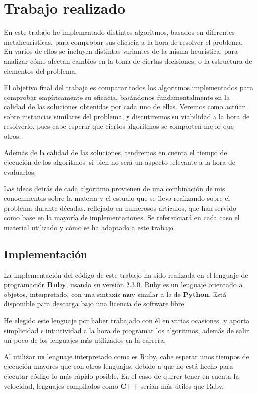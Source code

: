 \section{Trabajo realizado}

En este trabajo he implementado distintos algoritmos, basados en diferentes
metaheurísticas, para comprobar sus eficacia a la hora de resolver el problema.
En varios de ellos se incluyen distintas variantes de la misma heurística, para
analizar cómo afectan cambios en la toma de ciertas decisiones, o la estructura
de elementos del problema.

El objetivo final del trabajo es comparar todos los algoritmos implementados
para comprobar empíricamente su eficacia, basándonos fundamentalmente en la
calidad de las soluciones obtenidas por cada uno de ellos. Veremos como actúan
sobre instancias similares del problema, y discutiremos su viabilidad a la
hora de resolverlo, pues cabe esperar que ciertos algoritmos se comporten
mejor que otros.

Además de la calidad de las soluciones, tendremos en cuenta el tiempo de ejecución
de los algoritmos, si bien no será un aspecto relevante a la hora de evaluarlos.

Las ideas detrás de cada algoritmo provienen de una combinación de mis conocimientos
sobre la materia y el estudio que se lleva realizando sobre el problema durante décadas,
reflejado en numerosos artículos, que han servido como base en la mayoría de implementaciones.
Se referenciará en cada caso el material utilizado y cómo se ha adaptado a este trabajo.

\subsection{Implementación}

La implementación del código de este trabajo ha sido realizada en el lenguaje de
programación \textbf{Ruby}, usando su versión 2.3.0. Ruby es un lenguaje
orientado a objetos, interpretado, con una sintaxis muy similar a la de \textbf{Python}.
Está disponible para descarga bajo una licencia de software libre.

He elegido este lenguaje por haber trabajado con él en varias ocasiones, y aporta
simplicidad e intuitividad a la hora de programar los algoritmos, además de salir
un poco de los lenguajes más utilizados en la carrera.

Al utilizar un lenguaje interpretado como es Ruby, cabe esperar unos
tiempos de ejecución mayores que con otros lenguajes, debido a que no está hecho
para ejecutar código lo más rápido posible. En el caso de querer tener en cuenta la
velocidad, lenguajes compilados como \textbf{C++} serían más útiles que Ruby.


